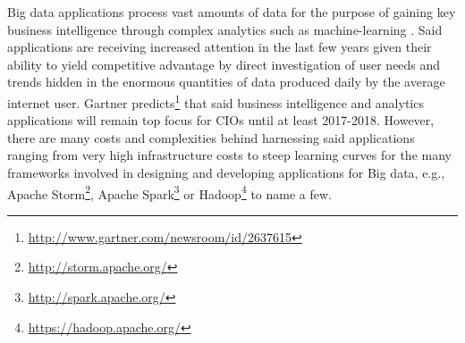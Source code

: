 
Big data applications process vast amounts of data \cite{bdsurvey} for the purpose of gaining key business intelligence through complex analytics such as machine-learning \cite{ml4bd}. Said applications are receiving increased attention in the last few years given their ability to yield competitive advantage by direct investigation of user needs and trends hidden in the enormous quantities of data produced daily by the average internet user. Gartner predicts\footnote{\url{http://www.gartner.com/newsroom/id/2637615}} that said business intelligence and analytics applications will remain top focus for CIOs until at least 2017-2018. 
However, there are many costs and complexities behind harnessing said applications ranging from very high infrastructure costs to steep learning curves for the many frameworks involved in designing and developing applications for Big data, e.g., Apache Storm\footnote{\url{http://storm.apache.org/}}, Apache Spark\footnote{\url{http://spark.apache.org/}} or Hadoop\footnote{\url{https://hadoop.apache.org/}} to name a few.

